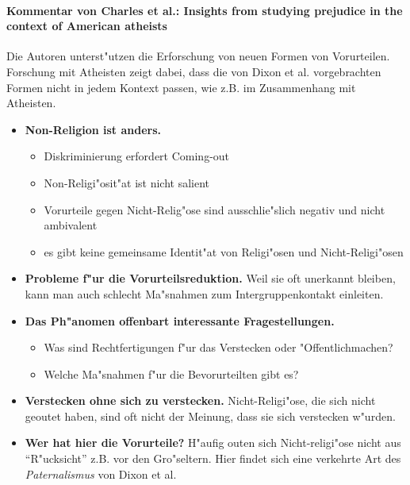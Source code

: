 \paragraph{Kommentar von Charles et al.: Insights from studying prejudice in the context of American atheists}
Die Autoren unterst"utzen die Erforschung von neuen Formen von Vorurteilen. Forschung mit Atheisten zeigt dabei, dass die von Dixon et al. vorgebrachten Formen nicht in jedem Kontext passen, wie z.B. im Zusammenhang mit Atheisten.
\begin{itemize}
        \item \textbf{Non-Religion ist anders.}
                \begin{itemize}
                        \item Diskriminierung erfordert Coming-out
                        \item Non-Religi"osit"at ist nicht salient
                        \item Vorurteile gegen Nicht-Relig"ose sind ausschlie"slich negativ und nicht ambivalent
                        \item es gibt keine gemeinsame Identit"at von Religi"osen und Nicht-Religi"osen 
                \end{itemize}
        \item \textbf{Probleme f"ur die Vorurteilsreduktion.} Weil sie oft unerkannt bleiben, kann man auch schlecht Ma"snahmen zum Intergruppenkontakt einleiten.
        \item \textbf{Das Ph"anomen offenbart interessante Fragestellungen.}
                \begin{itemize}
                        \item Was sind Rechtfertigungen f"ur das Verstecken oder "Offentlichmachen?
                        \item Welche Ma"snahmen f"ur die Bevorurteilten gibt es?
                \end{itemize}
        \item \textbf{Verstecken ohne sich zu verstecken.} Nicht-Religi"ose, die sich nicht geoutet haben, sind oft nicht der Meinung, dass sie sich verstecken w"urden.
        \item \textbf{Wer hat hier die Vorurteile?} H"aufig outen sich Nicht-religi"ose nicht aus ``R"ucksicht'' z.B. vor den Gro"seltern. Hier findet sich eine verkehrte Art des \emph{Paternalismus} von Dixon et al. 
\end{itemize}
